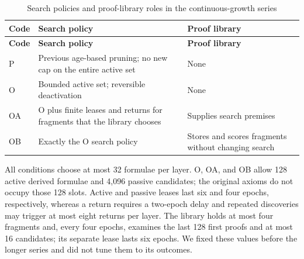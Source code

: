 \documentclass[pdflatex,sn-basic,Numbered]{sn-jnl}
\begin{document}
\begin{longtable}[]{@{}
  >{\raggedright\arraybackslash}p{}
  >{\raggedright\arraybackslash}p{}
  >{\raggedright\arraybackslash}p{}@{}}
\caption{Search policies and proof-library roles in the continuous-growth series}\label{tab:1}\tabularnewline
\toprule\noalign{}
\begin{minipage}[b]{\linewidth}\raggedright
\textbf{Code}
\end{minipage} & \begin{minipage}[b]{\linewidth}\raggedright
\textbf{Search policy}
\end{minipage} & \begin{minipage}[b]{\linewidth}\raggedright
\textbf{Proof library}
\end{minipage} \\
\midrule\noalign{}
\endfirsthead
\toprule\noalign{}
\begin{minipage}[b]{\linewidth}\raggedright
\textbf{Code}
\end{minipage} & \begin{minipage}[b]{\linewidth}\raggedright
\textbf{Search policy}
\end{minipage} & \begin{minipage}[b]{\linewidth}\raggedright
\textbf{Proof library}
\end{minipage} \\
\midrule\noalign{}
\endhead
\bottomrule\noalign{}
\endlastfoot
P & Previous age-based pruning; no new cap on the entire active set & None \\
O & Bounded active set; reversible deactivation & None \\
OA & O plus finite leases and returns for fragments that the library chooses & Supplies search premises \\
OB & Exactly the O search policy & Stores and scores fragments without changing search \\
\end{longtable}

\endgroup

All conditions choose at most 32 formulae per layer. O, OA, and OB allow 128 active derived formulae and 4,096 passive candidates; the original axioms do not occupy those 128 slots. Active and passive leases last six and four epochs, respectively, whereas a return requires a two-epoch delay and repeated discoveries may trigger at most eight returns per layer. The library holds at most four fragments and, every four epochs, examines the last 128 first proofs and at most 16 candidates; its separate lease lasts six epochs. We fixed these values before the longer series and did not tune them to its outcomes.
\end{document}
